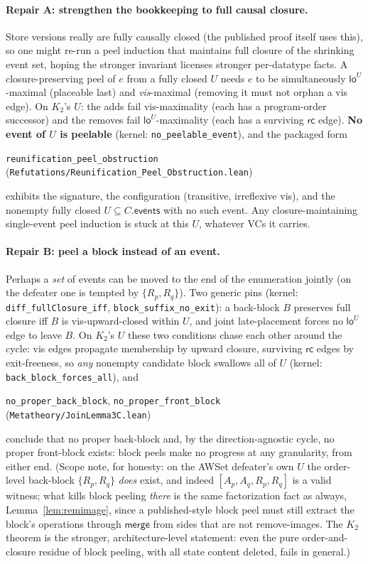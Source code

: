 \documentclass[11pt]{article}
\newcommand{\rcrel}{\mathsf{rc}}
\newcommand{\mergeL}{\mathsf{merge}}
\newcommand{\loE}[1]{\mathsf{lo}^{#1}}
\newcommand{\lean}[1]{\texttt{#1}}
\newcommand{\Ap}{A_p}
\newcommand{\Aq}{A_q}
\newcommand{\Rp}{R_p}
\newcommand{\Rq}{R_q}
\begin{document}
\paragraph{Repair A: strengthen the bookkeeping to full causal
closure.} Store versions really are fully causally closed (the
published proof itself uses this), so one might re-run a peel
induction that maintains full closure of the shrinking event set,
hoping the stronger invariant licenses stronger per-datatype facts. A
closure-preserving peel of $e$ from a fully closed $U$ needs $e$ to be
simultaneously $\loE{U}$-maximal (placeable last) and
\emph{vis}-maximal (removing it must not orphan a vis edge). On
$K_2$'s $U$: the adds fail vis-maximality (each has a program-order
successor) and the removes fail $\loE{U}$-maximality (each has a
surviving $\rcrel$ edge). \textbf{No event of $U$ is peelable}
(kernel: \lean{no\_peelable\_event}), and the packaged form
\begin{center}
\lean{reunification\_peel\_obstruction}
(\lean{Refutations/Reunification\_Peel\_Obstruction.lean})
\end{center}
exhibits the signature, the configuration (transitive, irreflexive
vis), and the nonempty fully closed $U \subseteq C.\mathsf{events}$
with no such event. Any closure-maintaining single-event peel
induction is stuck at this $U$, whatever VCs it carries.

\paragraph{Repair B: peel a block instead of an event.} Perhaps a
\emph{set} of events can be moved to the end of the enumeration
jointly (on the defeater one is tempted by $\{\Rp, \Rq\}$). Two
generic pins (kernel: \lean{diff\_fullClosure\_iff},
\lean{block\_suffix\_no\_exit}): a back-block $B$ preserves full
closure iff $B$ is vis-upward-closed within $U$, and joint
late-placement forces no $\loE{U}$ edge to leave $B$. On $K_2$'s $U$
these two conditions chase each other around the cycle: vis edges
propagate membership by upward closure, surviving $\rcrel$ edges by
exit-freeness, so \emph{any} nonempty candidate block swallows all of
$U$ (kernel: \lean{back\_block\_forces\_all}), and
\begin{center}
\lean{no\_proper\_back\_block}, \lean{no\_proper\_front\_block}
(\lean{Metatheory/JoinLemma3C.lean})
\end{center}
conclude that no proper back-block and, by the direction-agnostic
cycle, no proper front-block exists: block peels make no progress at
any granularity, from either end. (Scope note, for honesty: on the
AWSet defeater's own $U$ the order-level back-block $\{\Rp, \Rq\}$
\emph{does} exist, and indeed $[\Ap, \Aq, \Rp, \Rq]$ is a valid
witness; what kills block peeling \emph{there} is the same
factorization fact as always, Lemma~\ref{lem:remimage}, since a
published-style block peel must still extract the block's operations
through $\mergeL$ from sides that are not remove-images. The $K_2$
theorem is the stronger, architecture-level statement: even the pure
order-and-closure residue of block peeling, with all state content
deleted, fails in general.)
\end{document}
